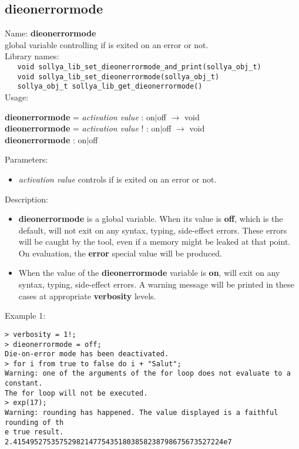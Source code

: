 \subsection{dieonerrormode}
\label{labdieonerrormode}
\noindent Name: \textbf{dieonerrormode}\\
\phantom{aaa}global variable controlling if \sollya is exited on an error or not.\\[0.2cm]
\noindent Library names:\\
\verb|   void sollya_lib_set_dieonerrormode_and_print(sollya_obj_t)|\\
\verb|   void sollya_lib_set_dieonerrormode(sollya_obj_t)|\\
\verb|   sollya_obj_t sollya_lib_get_dieonerrormode()|\\[0.2cm]
\noindent Usage: 
\begin{center}
\textbf{dieonerrormode} = \emph{activation value} : \textsf{on$|$off} $\rightarrow$ \textsf{void}\\
\textbf{dieonerrormode} = \emph{activation value} ! : \textsf{on$|$off} $\rightarrow$ \textsf{void}\\
\textbf{dieonerrormode} : \textsf{on$|$off}\\
\end{center}
Parameters: 
\begin{itemize}
\item \emph{activation value} controls if \sollya is exited on an error or not.
\end{itemize}
\noindent Description: \begin{itemize}

\item \textbf{dieonerrormode} is a global variable. When its value is \textbf{off}, which is the default,
   \sollya will not exit on any syntax, typing, side-effect errors. These
   errors will be caught by the tool, even if a memory might be leaked at 
   that point. On evaluation, the \textbf{error} special value will be produced.

\item When the value of the \textbf{dieonerrormode} variable is \textbf{on}, \sollya will exit
   on any syntax, typing, side-effect errors. A warning message will
   be printed in these cases at appropriate \textbf{verbosity} levels. 
\end{itemize}
\noindent Example 1: 
\begin{center}\begin{minipage}{15cm}\begin{Verbatim}[frame=single]
> verbosity = 1!;
> dieonerrormode = off;
Die-on-error mode has been deactivated.
> for i from true to false do i + "Salut";
Warning: one of the arguments of the for loop does not evaluate to a constant.
The for loop will not be executed.
> exp(17);
Warning: rounding has happened. The value displayed is a faithful rounding of th
e true result.
2.41549527535752982147754351803858238798675673527224e7
\end{Verbatim}
\end{minipage}\end{center}
